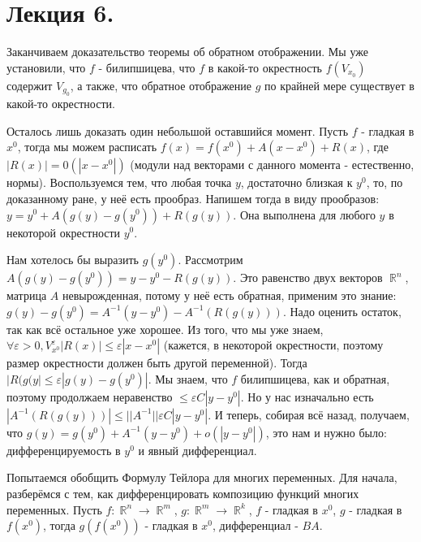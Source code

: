 \documentclass[a4paper,100pt]{article}
\theoremstyle{indented}
\theoremstyle{definition}
\theoremstyle{remark}
\DeclareMathOperator{\RR}{\mathbb{R}}
\begin{document}
\section{Лекция 6.}

Заканчиваем доказательство теоремы об обратном отображении. Мы уже установили, что $f$ - билипшицева, что $f$ в какой-то окрестность $f(V_{x_0})$ содержит $V_{g_0}$, а также, что обратное отображение $g$ по крайней мере существует в какой-то окрестности. \ 

Осталось лишь доказать один небольшой оставшийся момент. Пусть $f$ - гладкая в $x^0$, тогда мы можем расписать $f(x)=f(x^0)+A(x-x^0)+R(x)$, где $|R(x)|=0(|x-x^0|)$ (модули над векторами с данного момента - естественно, нормы). Воспользуемся тем, что любая точка $y$, достаточно близкая к $y^0$, то, по доказанному ране, у неё есть прообраз. Напишем тогда в виду прообразов: $y=y^0+A(g(y)-g(y^0))+R(g(y))$. Она выполнена для любого $y$ в некоторой окрестности $y^0$. \ 

Нам хотелось бы выразить $g(y^0)$. Рассмотрим $A(g(y)-g(y^0))=y-y^0-R(g(y))$. Это равенство двух векторов $\RR^n$, матрица $A$ невырожденная, потому у неё есть обратная, применим это знание: $g(y)-g(y^0)=A^{-1}(y-y^0)-A^{-1}(R(g(y)))$. Надо оценить остаток, так как всё остальное уже хорошее. Из того, что мы уже знаем, $\forall \varepsilon>0, V_{x^0}^\varepsilon |R(x)|\leq \varepsilon |x-x^0|$ (кажется, в некоторой окрестности, поэтому размер окрестности должен быть другой переменной). Тогда $|R(g(y|\leq \varepsilon |g(y)-g(y^0)|$. Мы знаем, что $f$ билипшицева, как и обратная, поэтому продолжаем неравенство $\leq \varepsilon C |y-y^0|$. Но у нас изначально есть $|A^{-1}(R(g(y)))|\leq ||A^{-1}||\varepsilon C |y-y^0|$. И теперь, собирая всё назад, получаем, что $g(y)=g(y^0)+A^{-1}(y-y^0)+o(|y-y^0|)$, это нам и нужно было: дифференцируемость в $y^0$ и явный дифференциал. \ 

Попытаемся обобщить Формулу Тейлора для многих переменных. Для начала, разберёмся с тем, как дифференцировать композицию функций многих переменных. Пусть $f:\RR^n\rightarrow \RR^m$, $g:\RR^m\rightarrow \RR^k$, $f$ - гладкая в $x^0$, $g$ - гладкая в $f(x^0)$, тогда $g(f(x^0))$ - гладкая в $x^0$, дифференциал - $BA$. 
\end{document}
